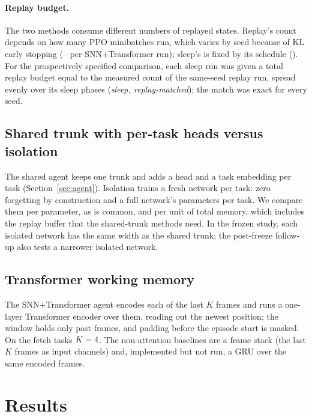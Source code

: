 \documentclass[10pt]{article}
\begin{document}
\paragraph{Replay budget.} The two methods consume different numbers of replayed states. Replay's count depends on
how many PPO minibatches run, which varies by seed because of KL early stopping (\matchSamplesMin--\matchSamplesMax
per SNN+Transformer run); sleep's is fixed by its schedule (\unmatchedSleepSamples). For the prospectively specified
comparison, each sleep run was given a total replay budget equal to the measured count of the same-seed replay run,
spread evenly over its sleep phases (\emph{sleep, replay-matched}); the match was exact for every seed.

\subsection{Shared trunk with per-task heads versus isolation}
The shared agent keeps one trunk and adds a head and a task embedding per task (Section~\ref{sec:agent}). Isolation
trains a fresh network per task: zero forgetting by construction and a full network's parameters per task. We compare
them per parameter, as is common, and per unit of total memory, which includes the replay buffer that the
shared-trunk methods need. In the frozen study, each isolated network has the same width as the shared trunk; the
post-freeze follow-up also tests a narrower isolated network.

\subsection{Transformer working memory}
The SNN+Transformer agent encodes each of the last $K$ frames and runs a one-layer Transformer encoder
\citep{vaswani2017attention} over them, reading out the newest position; the window holds only past frames, and padding
before the episode start is masked. On the fetch tasks $K=4$.
The non-attention baselines are a frame stack (the last $K$ frames as input channels) and, implemented but not run, a
GRU over the same encoded frames.

\section{Results}
\label{sec:results}
\end{document}
